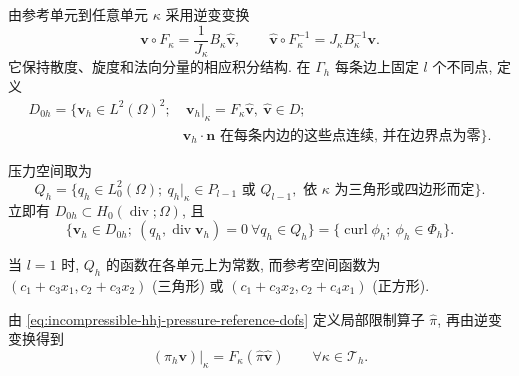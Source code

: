 由参考单元到任意单元 $\kappa$ 采用逆变变换
\begin{equation}\label{eq:incompressible-hhj-pressure-contravariant-transform}
\mathbf v\circ F_\kappa
=\frac1{J_\kappa}B_\kappa\widehat{\mathbf v},
\qquad
\widehat{\mathbf v}\circ F_\kappa^{-1}
=J_\kappa B_\kappa^{-1}\mathbf v.
\end{equation}
它保持散度、旋度和法向分量的相应积分结构.
在 $\Gamma_h$ 每条边上固定 $l$ 个不同点, 定义
\begin{equation}\label{eq:incompressible-hhj-pressure-velocity-space}
\begin{split}
D_{0h}=\{\mathbf v_h\in L^2(\Omega)^2;&
\ \mathbf v_h|_\kappa=F_\kappa\widehat{\mathbf v},
\ \widehat{\mathbf v}\in D;\\
&\mathbf v_h\cdot\mathbf n
\text{ 在每条内边的这些点连续, 并在边界点为零}\}.
\end{split}
\end{equation}

压力空间取为
\begin{equation}\label{eq:incompressible-hhj-pressure-space}
Q_h=\{q_h\in L_0^2(\Omega);
\ q_h|_\kappa\in P_{l-1}
\text{ 或 }Q_{l-1},
\text{ 依 }\kappa\text{ 为三角形或四边形而定}\}.
\end{equation}
立即有 $D_{0h}\subset H_0(\operatorname{div};\Omega)$, 且
\[
\{\mathbf v_h\in D_{0h};
\ (q_h,\operatorname{div}\mathbf v_h)=0\ \forall q_h\in Q_h\}
=\{\operatorname{curl}\phi_h;\ \phi_h\in\Phi_h\}.
\]

\begin{Remark}\label{rem:incompressible-hhj-pressure-lowest-order}
当 $l=1$ 时, $Q_h$ 的函数在各单元上为常数, 而参考空间函数为
$(c_1+c_3x_1,c_2+c_3x_2)$ (三角形) 或
$(c_1+c_3x_2,c_2+c_4x_1)$ (正方形).
\end{Remark}

由 \eqref{eq:incompressible-hhj-pressure-reference-dofs}
定义局部限制算子 $\widehat\pi$, 再由逆变变换得到
\begin{equation}\label{eq:incompressible-hhj-pressure-global-restriction}
(\pi_h\mathbf v)|_\kappa
=F_\kappa(\widehat\pi\widehat{\mathbf v})
\qquad\forall\kappa\in\mathcal T_h.
\end{equation}

